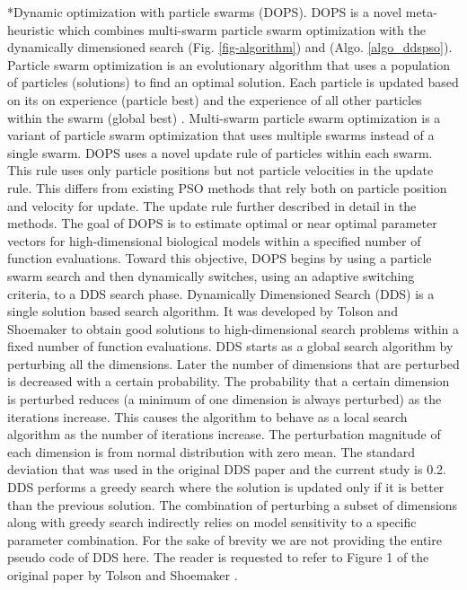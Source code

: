 \documentclass[12pt]{article}
\makeatletter
\renewcommand\subsection{\@startsection
	{subsection}{2}{0mm}
	{-0.05in}
	{-0.5\baselineskip}
	{\normalfont\normalsize\bfseries}}
\makeatother
\begin{document}
\subsection*{Dynamic optimization with particle swarms (DOPS).}
DOPS is a novel meta-heuristic which combines multi-swarm particle swarm optimization
with the dynamically dimensioned search (Fig. \ref{fig-algorithm}) and (Algo. \ref{algo_ddspso}).  Particle swarm optimization is an evolutionary algorithm that uses a population of particles (solutions) to find an optimal solution.
Each particle is updated based on its on experience (particle best) and the experience of all other particles within the swarm (global best) \cite{clerc2010particle}\cite{blondin2009particle}\cite{abraham2006swarm}.   
Multi-swarm particle swarm optimization is a variant of particle swarm optimization that uses multiple swarms instead of a single swarm.
DOPS uses a novel update rule of particles within each swarm. This rule uses only particle positions but not particle velocities in the update rule. This differs from existing PSO methods that rely both on particle position and velocity for update. 
The update rule further described in detail in the methods.
The goal of DOPS is to estimate optimal or near optimal parameter vectors for high-dimensional biological models within a specified number of function evaluations.
Toward this objective, DOPS begins by using a particle swarm search and then dynamically switches, using an adaptive switching criteria, to a DDS search phase.
Dynamically Dimensioned Search (DDS) is a single solution based search algorithm. It was developed by Tolson and Shoemaker to obtain good solutions to high-dimensional search problems within a fixed number of function evaluations. 
DDS starts as a global search algorithm by perturbing all the dimensions. Later the number of dimensions that are perturbed is decreased with a certain probability. 
The probability that a certain dimension is perturbed reduces (a minimum of one dimension is always perturbed) as the iterations increase. 
This causes the algorithm to behave as a local search algorithm as the number of iterations increase.
The perturbation magnitude of each dimension is from normal distribution with zero mean. The standard deviation that was used in the original DDS paper and the current study is 0.2.
DDS performs a greedy search where the solution is updated only if it is better than the previous solution.
The combination of perturbing a subset of dimensions along with greedy search indirectly relies on model sensitivity to a specific parameter combination. 
For the sake of brevity we are not providing the entire pseudo code of DDS here. The reader is requested to refer to Figure 1 of the original paper by Tolson and Shoemaker \cite{tolson2007dynamically}.
\end{document}
